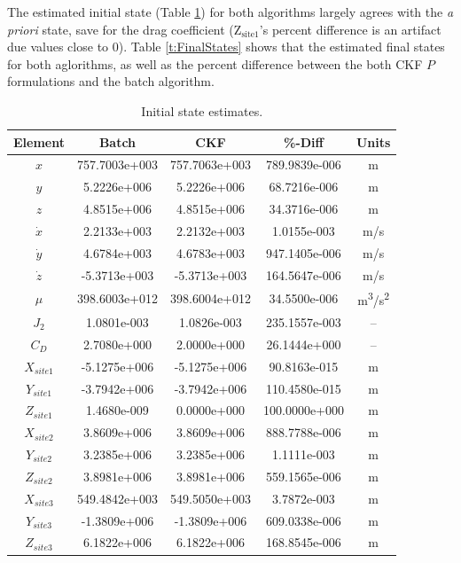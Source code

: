 \documentclass[]{aiaa-tc}%
\begin{document}
	The estimated initial state (Table \ref{t:InitStates}) for both algorithms largely agrees with the \textit{a priori} state, save for the drag coefficient (Z$_{\text{site1}}$'s percent difference is an artifact due values close to 0). Table \ref{t:FinalStates} shows that the estimated final states for both aglorithms, as well as the percent difference between the both CKF $P$ formulations and the batch algorithm.
	\begin{table}[H]%
		\begin{center}
			\caption{Initial state estimates.}
			\label{t:InitStates}
			\begin{tabular}{c|c|c|c|c}
\hline Element & Batch & CKF & \%-Diff & Units \\ \hline
$x$ &  757.7003e+003  & 757.7063e+003  & 789.9839e-006 & m\\
$y$  &   5.2226e+006  &   5.2226e+006 & 68.7216e-006 & m\\
$z$    & 4.8515e+006   &  4.8515e+006   & 34.3716e-006 & m\\
$\dot{x}$    & 2.2133e+003   &  2.2132e+003   &      1.0155e-003 & m/s\\
$\dot{y}$   &  4.6784e+003   &  4.6783e+003  & 947.1405e-006  & m/s\\
$\dot{z}$   & -5.3713e+003  &  -5.3713e+003  & 164.5647e-006 & m/s\\
$\mu$ &   398.6003e+012  & 398.6004e+012 & 34.5500e-006 & m\textsuperscript{3}/s\textsuperscript{2} \\
$J_2$ &     1.0801e-003   &  1.0826e-003 &   235.1557e-003  & --\\
$C_D$ &     2.7080e+000  &   2.0000e+000 & 26.1444e+000  & --\\
$X_{site1}$ &    -5.1275e+006 &   -5.1275e+006   &  90.8163e-015 & m\\
$Y_{site1}$ &    -3.7942e+006 &   -3.7942e+006  &  110.4580e-015 & m\\
$Z_{site1}$ &     1.4680e-009   &  0.0000e+000  &    100.0000e+000 & m\\
$X_{site2}$ &     3.8609e+006  &   3.8609e+006  & 888.7788e-006 & m\\
$Y_{site2}$ &     3.2385e+006  &   3.2385e+006  &   1.1111e-003 & m\\
$Z_{site2}$ &     3.8981e+006  &   3.8981e+006&  559.1565e-006 & m\\
$X_{site3}$ &   549.4842e+003 &   549.5050e+003 &  3.7872e-003 & m\\
$Y_{site3}$ &    -1.3809e+006 &   -1.3809e+006 & 609.0338e-006 & m\\
$Z_{site3}$ &     6.1822e+006  &   6.1822e+006 & 168.8545e-006  & m\\				
			\end{tabular}
		\end{center}
	\end{table}  	
\end{document}
